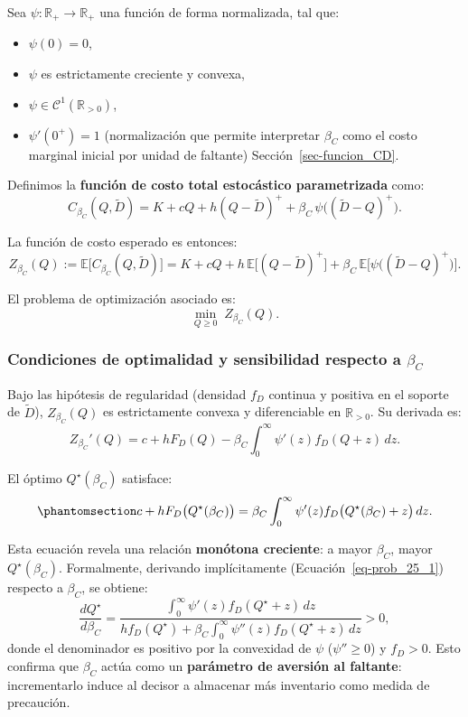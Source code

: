 \documentclass[
  spanish,
  us-letterpaper,
]{scrreprt}
\providecommand{\tightlist}{%
  \setlength{\itemsep}{0pt}\setlength{\parskip}{0pt}}
\numberwithin{equation}{section}
\begin{document}
Sea \(\psi: \mathbb{R}_+ \to \mathbb{R}_+\) una función de forma
normalizada, tal que:

\begin{itemize}
\tightlist
\item
  \(\psi(0) = 0\),
\item
  \(\psi\) es estrictamente creciente y convexa,
\item
  \(\psi \in \mathcal{C}^1(\mathbb{R}_{>0})\),
\item
  \(\psi'(0^+) = 1\) (normalización que permite interpretar \(\beta_C\)
  como el costo marginal inicial por unidad de faltante)
  Sección~\ref{sec-funcion_CD}.
\end{itemize}

Definimos la \textbf{función de costo total estocástico parametrizada}
como: \[
C_{\beta_C}(Q, \tilde{D}) = K + c Q + h (Q - \tilde{D})^+ + \beta_C \, \psi\big((\tilde{D} - Q)^+\big).
\]

La función de costo esperado es entonces: \[
Z_{\beta_C}(Q) := \mathbb{E}\big[ C_{\beta_C}(Q, \tilde{D}) \big] = K + c Q + h \, \mathbb{E}\big[(Q - \tilde{D})^+\big] + \beta_C \, \mathbb{E}\Big[\psi\big((\tilde{D} - Q)^+\big)\Big].
\]

El problema de optimización asociado es: \[
\min_{Q \geq 0} \; Z_{\beta_C}(Q).
\]

\subsubsection{\texorpdfstring{Condiciones de optimalidad y sensibilidad
respecto a
\(\beta_C\)}{Condiciones de optimalidad y sensibilidad respecto a \textbackslash beta\_C}}\label{condiciones-de-optimalidad-y-sensibilidad-respecto-a-beta_c}

Bajo las hipótesis de regularidad (densidad \(f_D\) continua y positiva
en el soporte de \(\tilde{D}\)), \(Z_{\beta_C}(Q)\) es estrictamente
convexa y diferenciable en \(\mathbb{R}_{>0}\). Su derivada es: \[
Z_{\beta_C}'(Q) = c + h F_D(Q) - \beta_C \int_0^\infty \psi'(z) f_D(Q + z) \, dz.
\]

El óptimo \(Q^\star(\beta_C)\) satisface:
\begin{equation}\phantomsection\label{eq-optimo_Q}{
c + h F_D\big(Q^\star(\beta_C)\big) = \beta_C \int_0^\infty \psi'(z) f_D\big(Q^\star(\beta_C) + z\big) \, dz.
}\end{equation}

Esta ecuación revela una relación \textbf{monótona creciente}: a mayor
\(\beta_C\), mayor \(Q^\star(\beta_C)\). Formalmente, derivando
implícitamente (Ecuación~\ref{eq-prob_25_1}) respecto a \(\beta_C\), se
obtiene: \[
\frac{d Q^\star}{d \beta_C} = 
\frac{\int_0^\infty \psi'(z) f_D(Q^\star + z) \, dz}
{h f_D(Q^\star) + \beta_C \int_0^\infty \psi''(z) f_D(Q^\star + z) \, dz} > 0,
\] donde el denominador es positivo por la convexidad de \(\psi\)
(\(\psi'' \geq 0\)) y \(f_D > 0\). Esto confirma que \(\beta_C\) actúa
como un \textbf{parámetro de aversión al faltante}: incrementarlo induce
al decisor a almacenar más inventario como medida de precaución.
\end{document}

